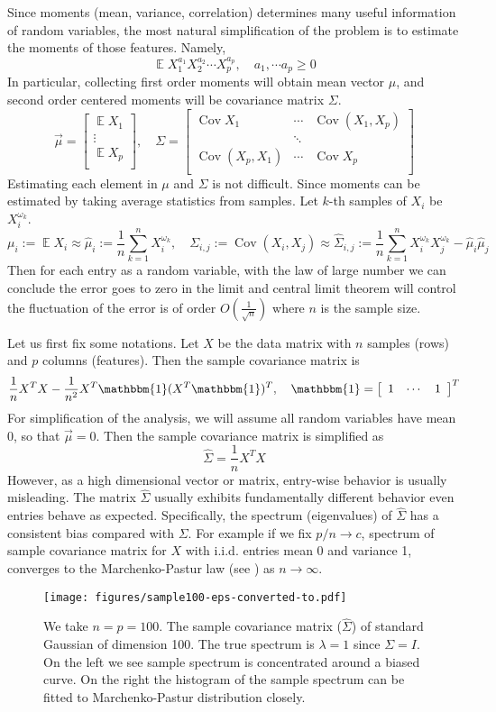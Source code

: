 \documentclass[12pt]{extarticle}
\newcommand{\1}{\field{1}}
\DeclareMathOperator{\cov}{Cov}
\DeclareMathOperator{\E}{\mathbb{E}}
\newcommand{\mat}[2][rrrrrrrrrrrrrrrrrrrrrrrrrrrrrrrr]{\left[ \begin{array}{#1} #2 \\ \end{array}\right]}
\numberwithin{equation}{section}
\begin{document}
Since moments (mean, variance, correlation) determines many useful information of random variables, the most natural simplification of the problem is to estimate the moments of those features. Namely,
\[
\E X_1^{a_1} X_2^{a_2} \cdots X_p^{a_p}, \quad a_1, \cdots a_p \ge 0
\]
In particular, collecting first order moments will obtain mean vector $\mu$, and  second order centered moments will be covariance matrix $\Sigma$.
\[
\vec{\mu} = \mat[c]{\E X_1 \\ \vdots \\ \E X_p}, \quad \Sigma = \mat[ccc]{\cov X_1 & \cdots & \cov(X_1, X_p) \\ & \ddots & \\ \cov(X_p, X_1) &\cdots &\cov X_p}
\]
Estimating each element in $\mu$ and $\Sigma$ is not difficult. Since moments can be estimated by taking average statistics from samples. Let $k$-th samples of $X_i$ be $X_i^{\omega_k}$.
\[
\mu_i:=\E X_i \approx \hat{\mu}_i:=\frac{1}{n} \sum_{k=1}^n X_{i}^{\omega_k}, \quad \Sigma_{i,j}:= \cov(X_i,X_j) \approx \hat{\Sigma}_{i,j}:= \frac{1}{n}\sum_{k=1}^n X_{i}^{\omega_k} X_{j}^{\omega_k} - \hat{\mu}_i \hat{\mu}_j
\]
Then for each entry as a random variable,  with the law of large number we can conclude the error goes to zero in the limit and central limit theorem will control the fluctuation of the error is of order $O(\frac{1}{\sqrt{n}})$ where $n$ is the sample size. 

Let us first fix some notations.  Let $X$ be the data matrix with $n$ samples (rows) and $p$ columns (features). Then the sample covariance matrix is 
\[
\frac{1}{n} X^T X -  \frac{1}{n^2} X^T \mathbbm{1} (X^T \mathbbm{1})^T, \quad \mathbbm{1}= \mat[ccc]{1 & \cdots & 1}^T
\]
For simplification of the analysis, we will assume all random variables have mean 0, so that $\vec{\mu}=0$. Then the sample covariance matrix is simplified as 
\[
\hat{\Sigma} = \frac{1}{n} X^T X 
\]
However, as a high dimensional vector or matrix, entry-wise behavior is usually misleading. The matrix $\hat{\Sigma}$ usually exhibits fundamentally different behavior even entries behave as expected. Specifically, the spectrum (eigenvalues) of $\hat{\Sigma}$  has a consistent bias compared with $\Sigma$. For example if we fix $p/n \to c$, spectrum of sample covariance matrix for $X$ with i.i.d. entries mean 0 and variance 1,
 converges to the Marchenko-Pastur law (see \cite{pastur1967}) as $n\to \infty$. 

\begin{figure}[H] 
	\centering
	   \texttt{[image: figures/sample100-eps-converted-to.pdf]} 
	\caption{We take $n=p=100$. The sample covariance matrix ($\hat{\Sigma}$) of standard Gaussian of dimension 100. The true spectrum is $\lambda=1$ since $\Sigma=I$. On the left we see sample spectrum is concentrated around a biased curve. On the right the histogram of the sample spectrum can be fitted to Marchenko-Pastur distribution closely.}\label{fig: sample spectrum Wishart 100}
\end{figure}
\end{document}
